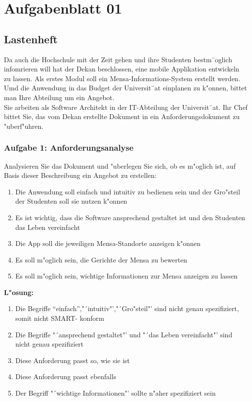 

\chapter{Aufgabenblatt 01}
\section{Lastenheft}
Da auch die Hochschule mit der Zeit gehen und ihre Studenten bestm¨oglich infomrieren will hat der Dekan beschlossen, eine mobile Applikation entwickeln zu lassen.
Als erstes Modul soll ein Mensa-Informations-System erstellt werden.
Umd die Anwendung in das Budget der Universit¨at einplanen zu k"onnen, bittet man Ihre Abteilung um ein Angebot.\\

\noindent
Sie arbeiten als Software Architekt in der IT-Abteilung der Universit¨at.
Ihr Chef bittet Sie, das vom Dekan erstellte Dokument in ein Anforderungsdokument zu "uberf"uhren.

\subsection{Aufgabe 1: Anforderungsanalyse}
Analysieren Sie das Dokument und "uberlegen Sie sich, ob es m"oglich ist, auf Basis dieser Beschreibung ein Angebot zu erstellen:
\begin{enumerate}
    \item Die Anwendung soll einfach und intuitiv zu bedienen sein und der Gro"steil der Studenten soll sie nutzen k"onnen
    \item Es ist wichtig, dass die Software ansprechend gestaltet ist und den Studenten das Leben vereinfacht
    \item Die App soll die jeweiligen Mensa-Standorte anzeigen k"onnen
    \item Es soll m"oglich sein, die Gerichte der Mensa zu bewerten
    \item Es soll m"oglich sein, wichtige Informationen zur Mensa anzeigen zu lassen
\end{enumerate}

\textbf{L"osung:}
\begin {enumerate}
    \item Die Begriffe "`einfach"',"´intuitiv"',"´Gro"steil"' sind nicht genau spezifiziert, somit nicht SMART- konform
    \item Die Begriffe "´ansprechend gestaltet"' und "´das Leben vereinfacht"' sind nicht genau spezifiziert
    \item Diese Anforderung passt so, wie sie ist
    \item Diese Anforderung passt ebenfalls
    \item Der Begriff "´wichtige Informationen"' sollte n"aher spezifiziert sein
\end{enumerate}
    
